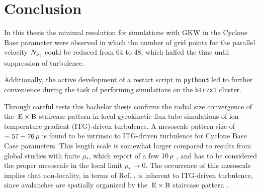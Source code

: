 
\NewPage
\chapter{Conclusion}
\label{chap:close}

\thispagestyle{empty}
\newpage

In this thesis the minimal resolution for simulations with GKW in the Cyclone Base parameter were observed in which the number of grid points for the parallel velocity $N_{\nu_\parallel}$ could be reduced from 64 to 48, which halfed the time until suppression of turbulence. \bigskip

Additionally, the active development of a restart script in \texttt{python3} led to further convenience during the task of performing simulations on the \texttt{btrzx1} cluster. \bigskip

Through careful tests this bachelor thesis confirms the radial size convergence of the $\mathrm{\:E}\times\mathrm{B}$ staircase pattern in local gyrokinetic flux tube simulations of ion temperature gradient (ITG)-driven turbulence.
A mesoscale pattern size of $\sim 57 - 76\,\rho$ is found to be intrinsic to ITG-driven turbulence for Cyclone Base Case parameters.
This length scale is somewhat larger compared to results from global studies with finite $\rho_\ast$, which report of a few $10\,\rho$ \cite{Pradalier2010}, and has to be considered the proper mesoscale in the local limit $\rho_\ast \rightarrow 0$.  
The occurrence of this mesoscale implies that non-locality, in terms of Ref. , is inherent to ITG-driven turbulence, since avalanches are spatially organized by the $\mathrm{\:E}\times\mathrm{B}$ staircase pattern \cite{McMillan2009, Pradalier2010, Rath2016, Peeters2016}. 